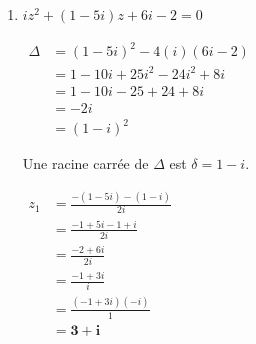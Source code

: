 \documentclass[12pt,a4paper]{article}
\begin{document}
\begin{enumerate}
\begin{enumerate}
        $
        \begin{aligned}
            \Delta &= (-i)^2 - 4(i)(-3 - i)\\
            &= -1 + 12i + 4i^2\\
            &= -1 + 12i - 4\\
            &= -5 + 12i
        \end{aligned}
        $
        
        D'après la question 1.c), une racine carrée de $\Delta$ est $\delta = 2 + 3i$.
        
        $
        \begin{aligned}
            z_1 &= \frac{i - (2 + 3i)}{2i}\\
            &= \frac{-2 - 2i}{2i}\\
            &= \frac{-1 - i}{i}\\
            &= \frac{(-1 - i)(-i)}{1}\\
            &= \mathbf{-1 + i}
        \end{aligned}
        $
        
        $
        \begin{aligned}
            z_2 &= \frac{i + (2 + 3i)}{2i}\\
            &= \frac{2 + 4i}{2i}\\
            &= \frac{1 + 2i}{i}\\
            &= \frac{(1 + 2i)(-i)}{1}\\
            &= \mathbf{2 - i}
        \end{aligned}
        $
        
        D'où $\mathcal{S} = \left\{\mathbf{-1 + i \,;\, 2 - i}\right\}$.

        \item $iz^2 + (1 - 5i)z + 6i - 2 = 0$
        
        $
        \begin{aligned}
            \Delta &= (1 - 5i)^2 - 4(i)(6i - 2)\\
            &= 1 - 10i + 25i^2 - 24i^2 + 8i\\
            &= 1 - 10i - 25 + 24 + 8i\\
            &= -2i\\
            &= (1 - i)^2
        \end{aligned}
        $
        
        Une racine carrée de $\Delta$ est $\delta = 1 - i$.
        
        $
        \begin{aligned}
            z_1 &= \frac{-(1 - 5i) - (1 - i)}{2i}\\
            &= \frac{-1 + 5i - 1 + i}{2i}\\
            &= \frac{-2 + 6i}{2i}\\
            &= \frac{-1 + 3i}{i}\\
            &= \frac{(-1 + 3i)(-i)}{1}\\
            &= \mathbf{3 + i}
        \end{aligned}
        $
        

\end{enumerate}
\end{enumerate}
\end{document}

